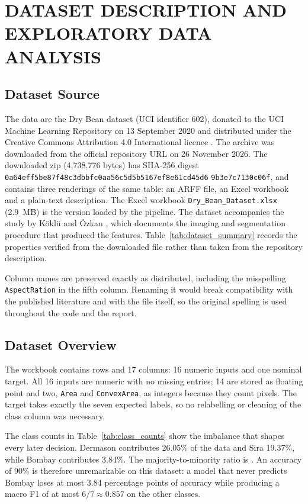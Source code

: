 \chapter{DATASET DESCRIPTION AND EXPLORATORY DATA ANALYSIS}

\section{Dataset Source}

The data are the Dry Bean dataset (UCI identifier 602), donated to the UCI
Machine Learning Repository on 13 September 2020 and distributed under the
Creative Commons Attribution 4.0 International licence \cite{uci602}. The
archive was downloaded from the official repository URL on 26 November 2026. The
downloaded zip (4,738,776 bytes) has SHA-256 digest
\texttt{0a64eff5be87f48c3dbbfc0a}\allowbreak\texttt{a56c5d5b5167ef8e61cd45d6}\allowbreak
\texttt{9b3e7c7130c06f}, and contains three renderings of the same table: an ARFF
file, an Excel workbook and a plain-text description. The Excel workbook
\texttt{Dry\_Bean\_Dataset.xlsx} (2.9~MB) is the version loaded by the pipeline.
The dataset accompanies the study by Köklü and Özkan \cite{koklu2020}, which
documents the imaging and segmentation procedure that produced the features.
Table~\ref{tab:dataset_summary} records the properties verified from the
downloaded file rather than taken from the repository description.



Column names are preserved exactly as distributed, including the misspelling
\texttt{AspectRation} in the fifth column. Renaming it would break compatibility
with the published literature and with the file itself, so the original spelling
is used throughout the code and the report.

\section{Dataset Overview}

The workbook contains \DatasetRows{} rows and 17 columns: 16 numeric inputs and
one nominal target. All 16 inputs are numeric with no missing entries; 14 are
stored as floating point and two, \texttt{Area} and \texttt{ConvexArea}, as
integers because they count pixels. The target takes exactly the seven expected
labels, so no relabelling or cleaning of the class column was necessary.

The class counts in Table~\ref{tab:class_counts} show the imbalance that shapes
every later decision. Dermason contributes 26.05\% of the data and Sira 19.37\%,
while Bombay contributes 3.84\%. The majority-to-minority ratio is
\ImbalanceRatio. An accuracy of 90\% is therefore unremarkable on this dataset: a
model that never predicts Bombay loses at most 3.84 percentage points of accuracy
while producing a macro F1 of at most $6/7 \approx 0.857$ on the other classes.

